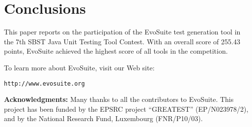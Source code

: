 \documentclass[sigconf,table]{acmart}
\newcommand{\EVOSUITE}{{\sc EvoSuite}\xspace}
\newcommand{\TOTALPOINTS}{{255.43}\xspace}
\begin{document}
\section{Conclusions}

This paper reports on the participation of the \EVOSUITE test
generation tool in the 7th SBST Java Unit Testing Tool Contest. With
an overall score of \TOTALPOINTS points, \EVOSUITE achieved the
highest score of all tools in the competition.


To learn more about \EVOSUITE, visit our Web site:
\begin{center}
\texttt{http://www.evosuite.org}
\end{center}



\textbf{Acknowledgments:} Many thanks to all the contributors to
\EVOSUITE.  This project has been funded by the EPSRC project
``GREATEST'' (EP/N023978/2), and by the National Research Fund,
Luxembourg (FNR/P10/03).




\balance
\end{document}
